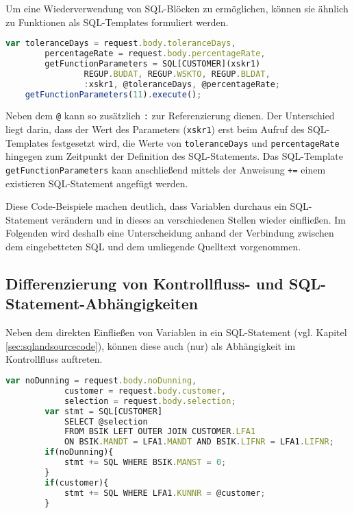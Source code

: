 Um eine Wiederverwendung von SQL-Blöcken zu ermöglichen, können sie ähnlich zu Funktionen als SQL-Templates \cite{Horschig2014} formuliert werden.

	\begin{lstlisting}[caption={SQL-Templates ermöglichen Wiederverwendung}, label={lst:sqlfunctions}, language=JavaScript]
	var toleranceDays = request.body.toleranceDays,
	    percentageRate = request.body.percentageRate,
	    getFunctionParameters = SQL[CUSTOMER](xskr1)
				REGUP.BUDAT, REGUP.WSKTO, REGUP.BLDAT,
				:xskr1, @toleranceDays, @percentageRate;
	getFunctionParameters(11).execute();
	\end{lstlisting}

Neben dem \texttt{@} kann so zusätzlich \texttt{:} zur Referenzierung dienen.
Der Unterschied liegt darin, dass der Wert des Parameters (\texttt{xskr1}) erst beim Aufruf des SQL-Templates festgesetzt wird, die Werte von \texttt{toleranceDays} und \texttt{percentageRate} hingegen zum Zeitpunkt der Definition des SQL-Statements.
Das SQL-Template \texttt{getFunctionParameters} kann anschließend mittels der Anweisung \texttt{+=} einem existieren SQL-Statement angefügt werden.

Diese Code-Beispiele machen deutlich, dass Variablen durchaus ein SQL-Statement verändern und in dieses an verschiedenen Stellen wieder einfließen.
Im Folgenden wird deshalb eine Unterscheidung anhand der Verbindung zwischen dem eingebetteten SQL und dem umliegende Quelltext vorgenommen.

\subsection{Differenzierung von Kontrollfluss- und SQL-Statement-Abhängigkeiten}\label{sec:controlflowandsqldependencies}
Neben dem direkten Einfließen von Variablen in ein SQL-Statement (vgl. Kapitel \ref{sec:sqlandsourcecode}), können diese auch (nur) als Abhängigkeit im Kontrollfluss auftreten.

	\begin{lstlisting}[caption={Verschiedene Arten von Abhängigkeiten der Variablen}, label={lst:differentdep}, language=JavaScript]
		var noDunning = request.body.noDunning,
		    customer = request.body.customer,
		    selection = request.body.selection;
		var stmt = SQL[CUSTOMER]
			SELECT @selection
			FROM BSIK LEFT OUTER JOIN CUSTOMER.LFA1
			ON BSIK.MANDT = LFA1.MANDT AND BSIK.LIFNR = LFA1.LIFNR;
		if(noDunning){
			stmt += SQL WHERE BSIK.MANST = 0;
		}
		if(customer){
			stmt += SQL WHERE LFA1.KUNNR = @customer;
		}
	\end{lstlisting}

